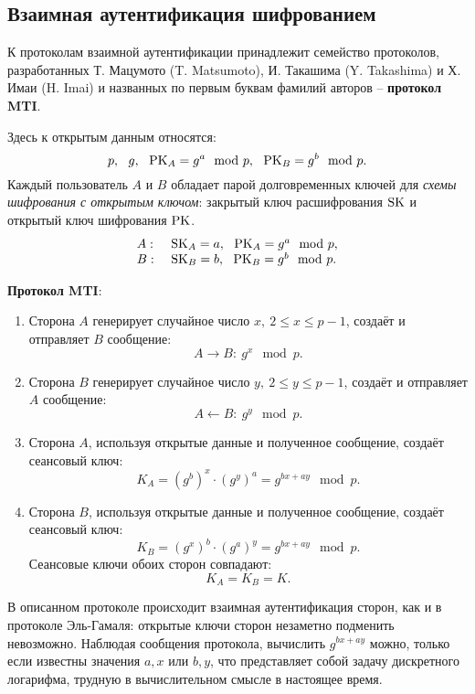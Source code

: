 \subsection{Взаимная аутентификация шифрованием}

К протоколам взаимной аутентификации принадлежит семейство протоколов, разработанных Т. Мацумото (T. Matsumoto), И. Такашима (Y. Takashima) и Х. Имаи (H. Imai) и названных по первым буквам фамилий авторов -- \textbf{протокол MTI}.

Здесь к открытым данным относятся:
    \[ p, ~~ g, ~~ \textrm{PK}_A = g^a \mod p, ~~ \textrm{PK}_B = g^b \mod p. \]
Каждый пользователь $A$ и $B$ обладает парой долговременных ключей для \emph{схемы шифрования с открытым ключом}: закрытый ключ расшифрования $\textrm{SK}$ и открытый ключ шифрования $\textrm{PK}$.
\[ \begin{array}{ll}
    A: & ~ \textrm{SK}_A = a, ~~ \textrm{PK}_A = g^a \mod p, \\
    B: & ~ \textrm{SK}_B = b, ~~ \textrm{PK}_B = g^b \mod p. \\
\end{array} \]

\textbf{Протокол MTI}:
\begin{enumerate}
    \item Сторона $A$ генерирует случайное число $x, ~ 2\leq x\leq p-1$, создаёт и отправляет $B$ сообщение:
        \[ A \rightarrow B: ~ g^x \mod p. \]
    \item Сторона $B$ генерирует случайное число $y, ~ 2\leq y\leq p-1$, создаёт и отправляет $A$ сообщение:
        \[ A \leftarrow B: ~ g^y \mod p. \]
    \item Сторона $A$, используя открытые данные и полученное сообщение, создаёт сеансовый ключ:
        \[ K_A = (g^b)^x \cdot (g^y)^a = g^{bx+ay} \mod p. \]
    \item Сторона $B$, используя открытые данные и полученное сообщение, создаёт сеансовый ключ:
        \[ K_B = (g^x)^b \cdot (g^a)^y = g^{bx+ay} \mod p. \]
        Сеансовые ключи обоих сторон совпадают:
        \[ K_{A} =K_{B} = K. \]
\end{enumerate}

В описанном протоколе происходит взаимная аутентификация сторон, как и в протоколе Эль-Гамаля: открытые ключи сторон незаметно подменить невозможно. Наблюдая сообщения протокола, вычислить $g^{bx+ay}$ можно, только если известны значения $a,x$ или $b,y$, что представляет собой задачу дискретного логарифма, трудную в вычислительном смысле в настоящее время.
